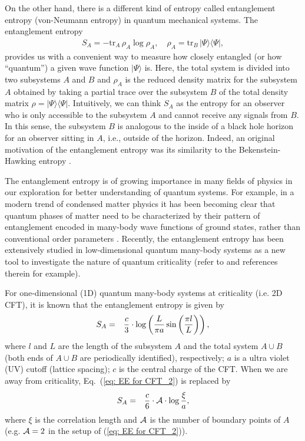 \documentclass[amsmath,amssymb,nofootinbib,eqsecnum,tighten,prd,12pt]{revtex4}
\def\frac#1#2{{#1\over #2}}
\def\f {\frac}
\def\frac#1#2{{#1\over #2}}
\begin{document}
On the other hand, there is a different kind of entropy called
entanglement entropy (von-Neumann entropy) in quantum mechanical
systems. The entanglement entropy
\begin{eqnarray}
S_A = - \mathrm{tr}_{A}\, \rho_{A} \log \rho_{A},\quad
\rho_{A}=\mathrm{tr}_{B}\, |\Psi\rangle \langle \Psi|, \label{eq:
def entanglement entropy}
\end{eqnarray}
provides us with a convenient way to measure how closely entangled
(or how ``quantum'') a given wave function $|\Psi\rangle$ is. Here,
the total system is divided into two subsystems $A$ and $B$ and
$\rho_{A}$ is the reduced density matrix for the subsystem $A$
obtained by taking a partial trace over the subsystem $B$ of the
total density matrix $\rho=|\Psi\rangle \langle \Psi|$. Intuitively,
we can think $S_A$ as the entropy for an observer who is only
accessible to the subsystem $A$ and cannot receive any signals from
$B$. In this sense, the subsystem $B$ is analogous to the inside of
a black hole horizon for an observer sitting in $A$, i.e., outside
of the horizon. Indeed, an original motivation of the entanglement
entropy was its similarity to the Bekenstein-Hawking entropy
\cite{Bombelli,Srednicki}.

The entanglement entropy is of growing importance in many fields of
physics in our exploration for better understanding of quantum
systems. For example, in a modern trend of condensed matter physics
it has been becoming clear that quantum phases of matter need to be
characterized by their pattern of entanglement encoded in many-body
wave functions of ground states, rather than conventional order
parameters \cite{VLRK,Kitaev05, Levin05}. Recently, the entanglement
entropy has been extensively studied in low-dimensional quantum
many-body systems as a new tool to investigate the nature of quantum
criticality (refer to \cite{Calabrese04} and references therein for
example).

For one-dimensional (1D) quantum many-body systems at criticality
(i.e. 2D CFT), it is known that the entanglement entropy is given by
\cite{Holzhey94,Calabrese04}
\begin{eqnarray}
S_A&=&\frac{c}{3}\cdot\log\left(\f{L}{\pi a}\sin\left(\f{\pi
l}{L}\right)\right),
 \label{eq: EE for CFT_2}
\end{eqnarray}
where $l$ and $L$ are the length of the subsystem $A$ and the total
system $A\cup B$ (both ends of $A\cup B$ are periodically
identified), respectively; $a$ is a ultra violet (UV) cutoff
(lattice spacing); $c$ is the central charge of the CFT. When we are
away from criticality, Eq.\ (\ref{eq: EE for CFT_2}) is replaced by
\cite{VLRK,Calabrese04}
\begin{eqnarray}
S_A &=&
\frac{c}{6}\cdot{\cal A}\cdot\log \f{\xi}{a},
\label{eq: EE for massive}
\end{eqnarray}
where $\xi$ is the correlation length and $\cal A$ is the number
of boundary points of $A$
(e.g. ${\cal A}=2$ in the setup of  (\ref{eq: EE for CFT_2})).
\end{document}
